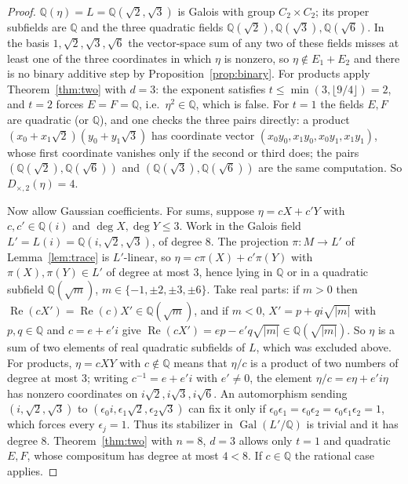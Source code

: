 \documentclass[11pt,a4paper]{article}
\theoremstyle{definition}
\theoremstyle{remark}
\newcommand{\Q}{\mathbb{Q}}
\newcommand{\Gal}{\operatorname{Gal}}
\newcommand{\dg}{\deg}
\newcommand{\Dtt}{D_{\times,2}}
\begin{document}
\begin{proof}
$\Q(\eta)=L=\Q(\sqrt2,\sqrt3)$ is Galois with group $C_2\times C_2$; its proper subfields are $\Q$
and the three quadratic fields $\Q(\sqrt2),\Q(\sqrt3),\Q(\sqrt6)$.  In the basis $1,\sqrt2,\sqrt3,
\sqrt6$ the vector-space sum of any two of these fields misses at least one of the three coordinates in
which $\eta$ is nonzero, so $\eta\notin E_1+E_2$ and there is no binary additive step by
Proposition~\ref{prop:binary}.  For products apply Theorem~\ref{thm:two} with $d=3$: the exponent
satisfies $t\le\min(3,\lfloor9/4\rfloor)=2$, and $t=2$ forces $E=F=\Q$, i.e.\ $\eta^2\in\Q$, which is
false.  For $t=1$ the fields $E,F$ are quadratic (or $\Q$), and one checks the three pairs directly: a
product $(x_0+x_1\sqrt2)(y_0+y_1\sqrt3)$ has coordinate vector $(x_0y_0,x_1y_0,x_0y_1,x_1y_1)$, whose
first coordinate vanishes only if the second or third does; the pairs $(\Q(\sqrt2),\Q(\sqrt6))$ and
$(\Q(\sqrt3),\Q(\sqrt6))$ are the same computation.  So $\Dtt(\eta)=4$.

Now allow Gaussian coefficients.  For sums, suppose $\eta=cX+c'Y$ with $c,c'\in\Q(i)$ and
$\dg X,\dg Y\le3$.  Work in the Galois field $L'=L(i)=\Q(i,\sqrt2,\sqrt3)$, of degree $8$.  The
projection $\pi:M\to L'$ of Lemma~\ref{lem:trace} is $L'$-linear, so $\eta=c\pi(X)+c'\pi(Y)$ with
$\pi(X),\pi(Y)\in L'$ of degree at most $3$, hence lying in $\Q$ or in a quadratic subfield $\Q(\sqrt m)$,
$m\in\{-1,\pm2,\pm3,\pm6\}$.  Take real parts: if $m>0$ then $\operatorname{Re}(cX')=\operatorname{Re}(c)
X'\in\Q(\sqrt m)$, and if $m<0$, $X'=p+qi\sqrt{|m|}$ with $p,q\in\Q$ and $c=e+e'i$ give
$\operatorname{Re}(cX')=ep-e'q\sqrt{|m|}\in\Q(\sqrt{|m|})$.  So $\eta$ is a sum of two elements of
real quadratic subfields of $L$, which was excluded above.  For products, $\eta=cXY$ with $c\notin\Q$
means that $\eta/c$ is a product of two numbers of degree at most $3$; writing $c^{-1}=e+e'i$ with
$e'\ne0$, the element $\eta/c=e\eta+e'i\eta$ has nonzero coordinates on $i\sqrt2,i\sqrt3,i\sqrt6$.
An automorphism sending $(i,\sqrt2,\sqrt3)$ to $(\epsilon_0i,\epsilon_1\sqrt2,\epsilon_2\sqrt3)$
can fix it only if $\epsilon_0\epsilon_1=\epsilon_0\epsilon_2=
\epsilon_0\epsilon_1\epsilon_2=1$, which forces every $\epsilon_j=1$.  Thus its stabilizer in
$\Gal(L'/\Q)$ is trivial and it has degree $8$.  Theorem~\ref{thm:two} with $n=8$,
$d=3$ allows only $t=1$ and quadratic $E,F$, whose compositum has degree at most $4<8$.  If $c\in\Q$
the rational case applies.
\end{proof}
\end{document}
